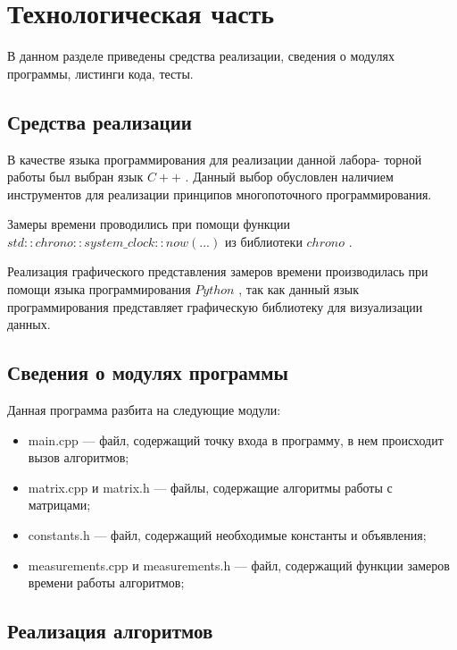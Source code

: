 \chapter{Технологическая часть}

В данном разделе приведены средства реализации, сведения о модулях программы, листинги кода, тесты.

\section{Средства реализации}

В качестве языка программирования для реализации данной лабора-
торной работы был выбран язык $C++$ \cite{c++}. Данный выбор обусловлен наличием инструментов для реализации принципов многопоточного программирования.

Замеры времени проводились при помощи функции $std::chrono::system\_clock::now(...)$ из библиотеки $chrono$ \cite{time}.

Реализация графического представления замеров времени производилась при помощи языка программирования $Python$ \cite{python}, так как данный язык программирования представляет графическую библиотеку для визуализации данных.

\section{Сведения о модулях программы}

Данная программа разбита на следующие модули:

\begin{itemize}
	\item main.cpp --- файл, содержащий точку входа в программу, в нем происходит вызов алгоритмов;
	\item matrix.cpp и matrix.h --- файлы, содержащие алгоритмы работы с матрицами;
	\item constants.h --- файл, содержащий необходимые константы и объявления;
	\item measurements.cpp и measurements.h --- файл, содержащий функции замеров времени работы алгоритмов;
\end{itemize}

\section{Реализация алгоритмов}

